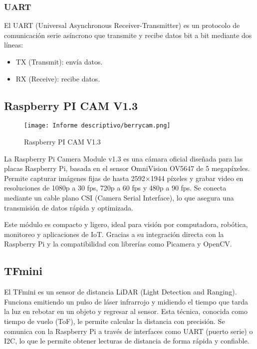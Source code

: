 \documentclass[12pt,a4paper]{article}
\begin{document}
\subsubsection{UART}

El UART (Universal Asynchronous Receiver-Transmitter) es un protocolo de comunicación serie asíncrono que transmite y recibe datos bit a bit mediante dos líneas:

\begin{itemize}
    
\item TX (Transmit): envía datos.

\item RX (Receive): recibe datos.

\end{itemize}

\subsection{Raspberry PI CAM V1.3}

\begin{figure}[H]
    \centering
    \texttt{[image: Informe descriptivo/berrycam.png]}
    \caption{Raspberry PI CAM V1.3}
\end{figure}

La Raspberry Pi Camera Module v1.3 es una cámara oficial diseñada para las placas Raspberry Pi, basada en el sensor OmniVision OV5647 de 5 megapíxeles. Permite capturar imágenes fijas de hasta 2592×1944 píxeles y grabar video en resoluciones de 1080p a 30 fps, 720p a 60 fps y 480p a 90 fps. Se conecta mediante un cable plano CSI (Camera Serial Interface), lo que asegura una transmisión de datos rápida y optimizada.

Este módulo es compacto y ligero, ideal para visión por computadora, robótica, monitoreo y aplicaciones de IoT. Gracias a su integración directa con la Raspberry Pi y la compatibilidad con librerías como Picamera y OpenCV.

\subsection{TFmini}
El TFmini es un sensor de distancia LiDAR (Light Detection and Ranging). Funciona emitiendo un pulso de láser infrarrojo y midiendo el tiempo que tarda la luz en rebotar en un objeto y regresar al sensor. Esta técnica, conocida como tiempo de vuelo (ToF), le permite calcular la distancia con precisión. Se comunica con la Raspberry Pi a través de interfaces como UART (puerto serie) o I2C, lo que le permite obtener lecturas de distancia de forma rápida y confiable.
\end{document}
